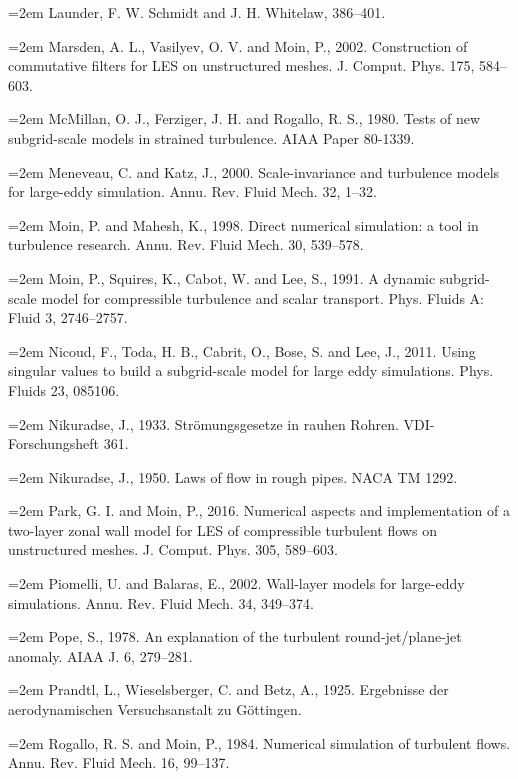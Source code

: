 \documentclass[12pt,a4paper,openany,fontset=none]{ctexbook}
\begin{document}
\par\hangindent=2em Launder, F. W. Schmidt and J. H. Whitelaw, 386–401.
\par\hangindent=2em Marsden, A. L., Vasilyev, O. V. and Moin, P., 2002. Construction of commutative filters for LES on unstructured meshes. J. Comput. Phys. 175, 584–603.
\par\hangindent=2em McMillan, O. J., Ferziger, J. H. and Rogallo, R. S., 1980. Tests of new subgrid-scale models in strained turbulence. AIAA Paper 80-1339.
\par\hangindent=2em Meneveau, C. and Katz, J., 2000. Scale-invariance and turbulence models for large-eddy simulation. Annu. Rev. Fluid Mech. 32, 1–32.
\par\hangindent=2em Moin, P. and Mahesh, K., 1998. Direct numerical simulation: a tool in turbulence research. Annu. Rev. Fluid Mech. 30, 539–578.
\par\hangindent=2em Moin, P., Squires, K., Cabot, W. and Lee, S., 1991. A dynamic subgrid-scale model for compressible turbulence and scalar transport. Phys. Fluids A: Fluid 3, 2746–2757.
\par\hangindent=2em Nicoud, F., Toda, H. B., Cabrit, O., Bose, S. and Lee, J., 2011. Using singular values to build a subgrid-scale model for large eddy simulations. Phys. Fluids 23, 085106.
\par\hangindent=2em Nikuradse, J., 1933. Strömungsgesetze in rauhen Rohren. VDI-Forschungsheft 361.
\par\hangindent=2em Nikuradse, J., 1950. Laws of flow in rough pipes. NACA TM 1292.
\par\hangindent=2em Park, G. I. and Moin, P., 2016. Numerical aspects and implementation of a two-layer zonal wall model for LES of compressible turbulent flows on unstructured meshes. J. Comput. Phys. 305, 589–603.
\par\hangindent=2em Piomelli, U. and Balaras, E., 2002. Wall-layer models for large-eddy simulations. Annu. Rev. Fluid Mech. 34, 349–374.
\par\hangindent=2em Pope, S., 1978. An explanation of the turbulent round-jet/plane-jet anomaly. AIAA J. 6, 279–281.
\par\hangindent=2em Prandtl, L., Wieselsberger, C. and Betz, A., 1925. Ergebnisse der aerodynamischen Versuchsanstalt zu Göttingen.
\par\hangindent=2em Rogallo, R. S. and Moin, P., 1984. Numerical simulation of turbulent flows. Annu. Rev. Fluid Mech. 16, 99–137.
\end{document}
